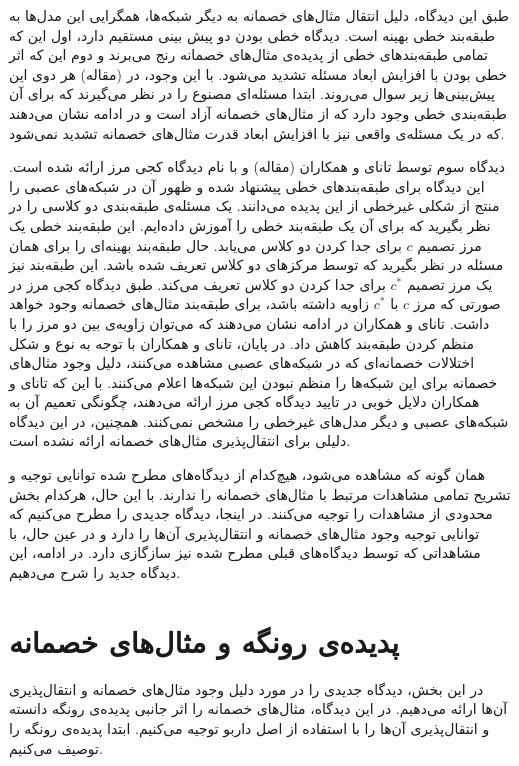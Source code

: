 \documentclass[12pt,onecolumn,a4paper]{article}
\begin{document}
طبق این دیدگاه، دلیل انتقال مثال‌های خصمانه به دیگر شبکه‌ها، همگرایی این مدل‌ها به طبقه‌بند خطی بهینه است. دیدگاه خطی بودن دو پیش بینی مستقیم دارد، اول این که تمامی طبقه‌بندهای خطی از پدیده‌ی مثال‌های خصمانه رنج می‌برند و دوم این که اثر خطی بودن با افزایش ابعاد مسئله تشدید می‌شود. با این وجود، در
(مقاله)
هر دوی این پیش‌بینی‌ها زیر سوال می‌روند. ابتدا مسئله‌ای  مصنوع را در نظر می‌گیرند که برای آن طبقه‌بندی خطی وجود دارد که از مثال‌های خصمانه آزاد است و در ادامه نشان می‌دهند که در یک مسئله‌ی واقعی نیز با افزایش ابعاد قدرت مثال‌های خصمانه تشدید نمی‌شود.

دیدگاه سوم توسط تانای و همکاران
(مقاله)
 و با نام دیدگاه کجی مرز ارائه شده است. این دیدگاه برای طبقه‌بندهای خطی پیشنهاد شده و ظهور آن در شبکه‌های عصبی را منتج از شکلی غیرخطی از این پدیده می‌دانند. یک مسئله‌ی طبقه‌بندی دو کلاسی را در نظر بگیرید که برای آن یک طبقه‌بند خطی را آموزش داده‌ایم. این طبقه‌بند خطی یک مرز تصمیم
 $c$
 برای جدا کردن دو کلاس می‌یابد. حال طبقه‌بند بهینه‌ای را برای همان مسئله در نظر بگیرید که توسط مرکزهای دو کلاس تعریف شده باشد. این طبقه‌بند نیز یک مرز تصمیم
 $c^*$
 برای جدا کردن دو کلاس تعریف می‌کند. طبق دیدگاه کجی مرز در صورتی که مرز
 $c$
 با
 $c^*$
 زاویه داشته باشد، برای طبقه‌بند مثال‌های خصمانه وجود خواهد داشت. تانای و همکاران در ادامه نشان می‌دهند که می‌توان زاویه‌ی بین دو مرز را با منظم کردن
طبقه‌بند کاهش داد. در پایان، تانای و همکاران با توجه به نوع و شکل اختلالات خصمانه‌ای که در شبکه‌های عصبی مشاهده می‌کنند، دلیل وجود مثال‌های خصمانه برای این شبکه‌ها را منظم نبودن این شبکه‌ها اعلام می‌کنند. با این که تانای و همکاران دلایل خوبی در تایید دیدگاه کجی مرز ارائه می‌دهند، چگونگی تعمیم آن به شبکه‌های عصبی و دیگر مدل‌های غیرخطی را مشخص نمی‌کنند. همچنین، در این دیدگاه دلیلی برای انتقال‌پذیری مثال‌های خصمانه ارائه نشده است.

همان گونه که مشاهده می‌شود، هیچ‌کدام از دیدگاه‌های مطرح شده توانایی توجیه و تشریح تمامی مشاهدات مرتبط با مثال‌های خصمانه را ندارند. با این حال، هرکدام بخش محدودی از مشاهدات را توجیه می‌کنند. در اینجا، دیدگاه جدیدی را مطرح می‌کنیم که توانایی توجیه وجود مثال‌های خصمانه و انتقال‌پذیری آن‌ها را دارد و  در عین حال، با مشاهداتی که توسط دیدگاه‌های قبلی مطرح شده نیز سازگازی دارد. در ادامه، این دیدگاه جدید را شرح می‌دهیم.

\section{پدیده‌ی رونگه و مثال‌های خصمانه}
در این بخش، دیدگاه جدیدی را در مورد دلیل وجود مثال‌های خصمانه و انتقال‌پذیری آن‌ها ارائه می‌دهیم. در این دیدگاه، مثال‌های خصمانه را اثر جانبی پدیده‌ی رونگه دانسته و انتقال‌پذیری آن‌ها را با استفاده از اصل داربو توجیه می‌کنیم. ابتدا پدیده‌ی رونگه را توصیف می‌کنیم.
\end{document}
